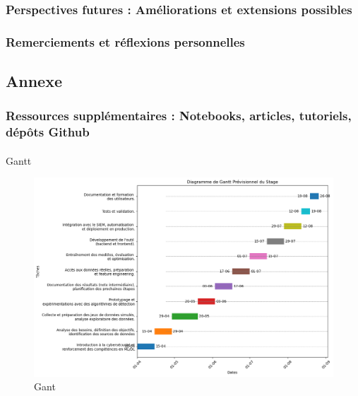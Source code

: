 \documentclass[
  letterpaper,
  DIV=11,
  numbers=noendperiod]{scrartcl}
\makeatletter
\let\oldparagraph\paragraph
\renewcommand{\paragraph}{
    \@ifstar
      \xxxParagraphStar
      \xxxParagraphNoStar
  }
\newcommand{\xxxParagraphStar}[1]{\oldparagraph*{#1}\mbox{}}
\newcommand{\xxxParagraphNoStar}[1]{\oldparagraph{#1}\mbox{}}
\makeatother
\begin{document}
\subsubsection{Perspectives futures : Améliorations et extensions
possibles}\label{perspectives-futures-amuxe9liorations-et-extensions-possibles}

\subsubsection{Remerciements et réflexions
personnelles}\label{remerciements-et-ruxe9flexions-personnelles}

\subsection{Annexe}\label{annexe}

\subsubsection{Ressources supplémentaires : Notebooks, articles,
tutoriels, dépôts
Github}\label{ressources-suppluxe9mentaires-notebooks-articles-tutoriels-duxe9puxf4ts-github}

\paragraph{Gantt}\label{gantt}

\begin{figure}[H]

{\centering \includegraphics{figures/gantt.png}

}

\caption{Gant}

\end{figure}%
\end{document}
